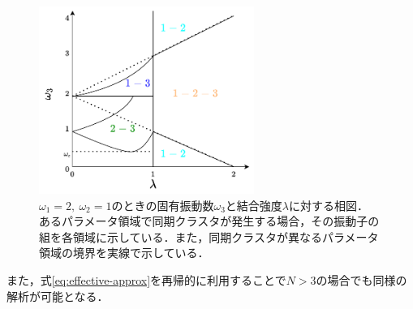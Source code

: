 \documentclass[../main]{subfiles}
\begin{document}
\begin{figure}[t]
\centering
\includegraphics[width=70mm]{./images/appendix-bifurcation.pdf}
\centering
\caption{$\omega_1=2,\ \omega_2=1$のときの固有振動数$\omega_3$と結合強度$\lambda$に対する相図．
あるパラメータ領域で同期クラスタが発生する場合，その振動子の組を各領域に示している．また，同期クラスタが異なるパラメータ領域の境界を実線で示している．}
\label{fig:appendix-bifurcation}
\end{figure}
また，式\eqref{eq:effective-approx}を再帰的に利用することで$N>3$の場合でも同様の解析が可能となる．
\end{document}
